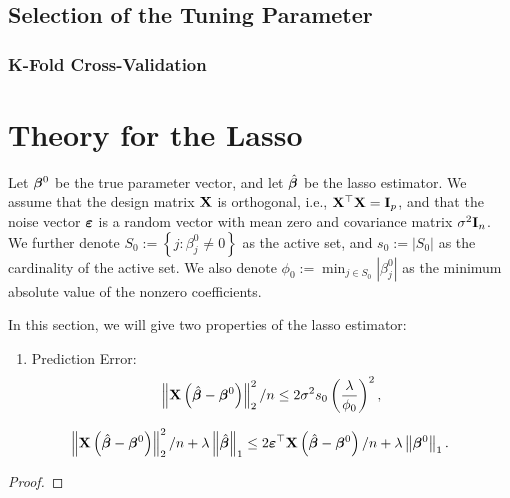 \subsection{Selection of the Tuning Parameter}

\subsubsection{K-Fold Cross-Validation}

\section{Theory for the Lasso}

Let $\boldsymbol{\beta}^{0}$ be the true parameter vector, and let $\hat{\boldsymbol{\beta}}$ be the lasso estimator. We assume that the design matrix ${\bf X}$ is orthogonal, i.e., ${\bf X}^{\top}{\bf X}={\bf I}_{p}$, and that the noise vector $\boldsymbol{\varepsilon}$ is a random vector with mean zero and covariance matrix $\sigma^{2}{\bf I}_{n}$.
We further denote $S_{0}:=\left\{j:\beta_{j}^{0}\neq 0\right\}$ as the active set, and $s_{0}:=\left|S_{0}\right|$ as the cardinality of the active set. We also denote $\phi_{0}:=\min_{j\in S_{0}}\left|\beta_{j}^{0}\right|$ as the minimum absolute value of the nonzero coefficients.

In this section, we will give two properties of the lasso estimator:
\begin{enumerate}
	\item Prediction Error:
	\begin{equation*}
		\left\|{\bf X}\left(\hat{\boldsymbol{\beta}}-\boldsymbol{\beta}^{0}\right)\right\|_{2}^{2}/n\leq 2\sigma^{2}s_{0}\left(\frac{\lambda}{\phi_{0}}\right)^{2},
	\end{equation*}
\end{enumerate}

\begin{lemma}
	\label{lem:basic-inequality}
	\begin{equation*}
		\left\|{\bf X}\left(\hat{\boldsymbol{\beta}}-\boldsymbol{\beta}^{0}\right)\right\|_{2}^{2}/n+\lambda\left\|\hat{\boldsymbol{\beta}}\right\|_{1}\leq 2\boldsymbol{\varepsilon}^{\top}{\bf X}\left(\hat{\boldsymbol{\beta}}-\boldsymbol{\beta}^{0}\right)/n+\lambda\left\|\boldsymbol{\beta}^{0}\right\|_{1}.
	\end{equation*}
\end{lemma}

\begin{proof}

\end{proof}

